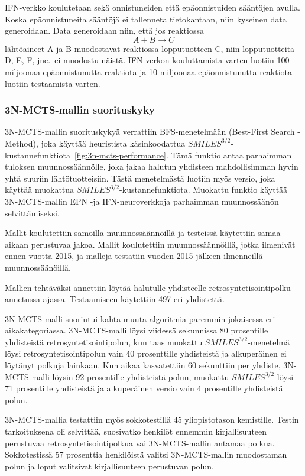 \documentclass[finnish,twoside,censored,tkt,sw-line]{HYthesisML}
\begin{document}
IFN-verkko koulutetaan sekä onnistuneiden että epäonnistuiden sääntöjen avulla.
Koska epäonnistuneita sääntöjä ei tallenneta tietokantaan, niin kyseinen data generoidaan.
Data generoidaan niin, että jos reaktiossa \[A + B \rightarrow C\] lähtöaineet A ja B muodostavat reaktiossa lopputuotteen C, niin lopputuotteita D, E, F, jne.\ ei muodostu näistä.
IFN-verkon kouluttamista varten luotiin 100 miljoonaa epäonnistunutta reaktiota ja 10 miljoonaa epäonnistunutta reaktiota luotiin testaamista varten.

\subsubsection{3N-MCTS-mallin suorituskyky}

3N-MCTS-mallin suorituskykyä verrattiin BFS-menetelmään (Best-First Search -Method), joka käyttää heuristista käsinkoodattua \(SMILES^{3/2}\)-kustannefunktiota~\ref{fig:3n-mcts-performance}.
Tämä funktio antaa parhaimman tuloksen muunnossäännölle, joka jakaa halutun yhdisteen mahdollisimman hyvin yhtä suuriin lähtötuotteisiin.
Tästä menetelmästä luotiin myös versio, joka käyttää muokattua \(SMILES^{3/2}\)-kustannefunktiota.
Muokattu funktio käyttää 3N-MCTS-mallin EPN -ja IFN-neuroverkkoja parhaimman muunnossäänön selvittämiseksi.

Mallit koulutettiin samoilla muunnossäännöillä ja testeissä käytettiin samaa aikaan perustuvaa jakoa.
Mallit koulutettiin muunnossäännöillä, jotka ilmenivät ennen vuotta 2015, ja malleja testatiin vuoden 2015 jälkeen ilmenneillä muunnossäänöillä.

Mallien tehtäväksi annettiin löytää halutulle yhdisteelle retrosyntetisointipolku annetussa ajassa.
Testaamiseen käytettiin 497 eri yhdistettä.

3N-MCTS-malli suoriutui kahta muuta algoritmia paremmin jokaisessa eri aikakategoriassa.
3N-MCTS-malli löysi viidessä sekunnissa 80 prosentille yhdisteistä retrosyntetisointipolun, kun taas muokattu \(SMILES^{3/2}\)-menetelmä löysi retrosyntetisointipolun vain 40 prosenttille yhdisteistä ja alkuperäinen ei löytänyt polkuja lainkaan.
Kun aikaa kasvatettiin 60 sekunttiin per yhdiste, 3N-MCTS-malli löysin 92 prosentille yhdisteistä polun, muokattu \(SMILES^{3/2}\) löysi 71 prosentille yhdisteistä ja alkuperäinen versio vain 4 prosentille yhdisteistä polun.

3N-MCTS-mallia testattiin myös sokkotestillä 45 yliopistotason kemistille.
Testin tarkoituksena oli selvittää, suosivatko henkilöt ennemmin kirjallisuuteen perustuvaa retrosyntetisointipolkua vai 3N-MCTS-mallin antamaa polkua.
Sokkotestissä 57 prosenttia henkilöistä valitsi 3N-MCTS-mallin muodostaman polun ja loput valitsivat kirjallisuuteen perustuvan polun.
\end{document}
